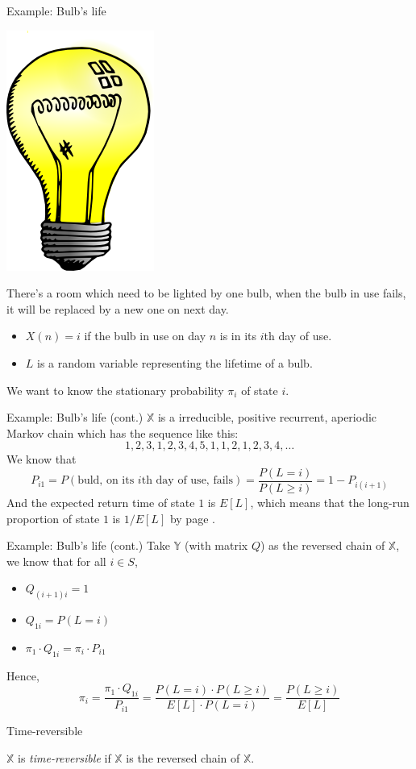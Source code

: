 \documentclass[mathserif]{beamer}
\begin{document}
\begin{frame}{Example: Bulb's life}
\begin{center}
\includegraphics[scale=0.1]{light_bulb_1.png}
\end{center}
There's a room which need to be lighted by one bulb, when the bulb in use fails, it will be replaced by a new one on next day.
\begin{itemize}
\item $X(n) = i$ if the bulb in use on day $n$ is in its $i$th day of use.
\item $L$ is a random variable representing the lifetime of a bulb.
\end{itemize}
We want to know the stationary probability $\pi_i$ of state $i$.
\end{frame}

\begin{frame}{Example: Bulb's life (cont.)}
$\mathbb{X}$ is a irreducible, positive recurrent, aperiodic Markov chain which has the sequence like this:
\[
1,2,3,1,2,3,4,5,1,1,2,1,2,3,4,\ldots
\]
We know that
\[
P_{i1} = P(\text{buld, on its $i$th day of use, fails}) = \frac{P(L=i)}{P(L\geq i)} = 1 - P_{i(i+1)}
\]
And the expected return time of state $1$ is $E[L]$, which means that the long-run proportion of state $1$ is $1/E[L]$ by page \pageref{pro_value}.
\end{frame}

\begin{frame}{Example: Bulb's life (cont.)}
Take $\mathbb{Y}$ (with matrix $Q$) as the reversed chain of $\mathbb{X}$, we know that for all $i\in S$,
\begin{itemize}
\item $Q_{(i+1)i} = 1$
\item $Q_{1i} = P(L = i)$
\item $\pi_1\cdot Q_{1i} = \pi_i\cdot P_{i1}$
\end{itemize}
Hence,
\[
\pi_i = \frac{\pi_1\cdot Q_{1i}}{P_{i1}} = 
\frac{P(L=i)\cdot P(L\geq i)}{E[L]\cdot P(L=i)} = \frac{P(L\geq i)}{E[L]}
\]
\end{frame}

\begin{frame}{Time-reversible}
\begin{definition}
$\mathbb{X}$ is \textit{time-reversible} if $\mathbb{X}$ is the reversed chain of $\mathbb{X}$.
\end{definition}
\end{frame}
\end{document}
